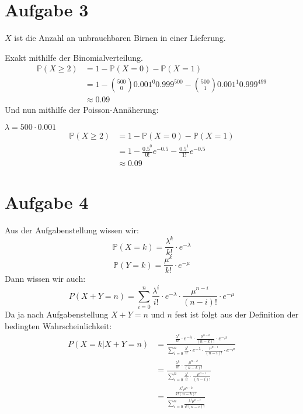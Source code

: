 \documentclass[10pt,a4paper,parskip=half]{scrartcl}
\begin{document}
\section*{Aufgabe 3}
$X$ ist die Anzahl an unbrauchbaren Birnen in einer Lieferung.

Exakt mithilfe der Binomialverteilung.
\begin{align*}
\mathbb P(X \ge 2) &= 1 - \mathbb P(X = 0) - \mathbb P(X = 1)\\
&= 1 - {500 \choose 0 } 0.001^0 0.999^500 - {500 \choose 1 } 0.001^1 0.999^499\\
&\approx 0.09
\end{align*}
Und nun mithilfe der Poisson-Annäherung:

$\lambda = 500 \cdot 0.001$
\begin{align*}
\mathbb P(X \ge 2) &= 1 - \mathbb P(X = 0) - \mathbb P(X = 1)\\
&= 1 - \frac{0.5^0}{0!}e^{-0.5} - \frac{0.5^1}{1!}e^{-0.5}\\
& \approx 0.09
\end{align*}
\section*{Aufgabe 4}
Aus der Aufgabenstellung wissen wir:
$$\mathbb P(X=k) = \frac{\lambda^k}{k!}\cdot e^{-\lambda}$$
$$\mathbb P(Y=k) = \frac{\mu^k}{k!}\cdot e^{-\mu}$$
Dann wissen wir auch:
$$P(X+Y=n) = \sum^n_{i=0} \frac{\lambda^i}{i!}\cdot e^{-\lambda} \cdot\frac{\mu^{n-i}}{(n-i)!}\cdot e^{-\mu}$$
Da ja nach Aufgabenstellung $X+Y=n$ und $n$ fest ist folgt aus der Definition der bedingten Wahrscheinlichkeit:
\begin{align*}P(X=k|X+Y=n) &= \frac{\frac{\lambda^k}{k!}\cdot e^{-\lambda} \cdot\frac{\mu^{n-k}}{(n-k)!} \cdot e^{-\mu}}{\sum^n_{i=0} \frac{\lambda^i}{i!}\cdot e^{-\lambda} \cdot\frac{\mu^{n-i}}{(n-i)!}\cdot e^{-\mu}}\\
&=\frac{\frac{\lambda^k}{k!} \cdot\frac{\mu^{n-k}}{(n-k)!}}{\sum^n_{i=0} \frac{\lambda^i}{i!} \cdot\frac{\mu^{n-i}}{(n-i)!}}\\
&=\frac{\frac{\lambda^k\mu^{n-k}}{k!(n-k)!}}{\sum^n_{i=0} \frac{\lambda^i\mu^{n-i}}{i!(n-i)!}}\\
\end{align*}
\end{document}

